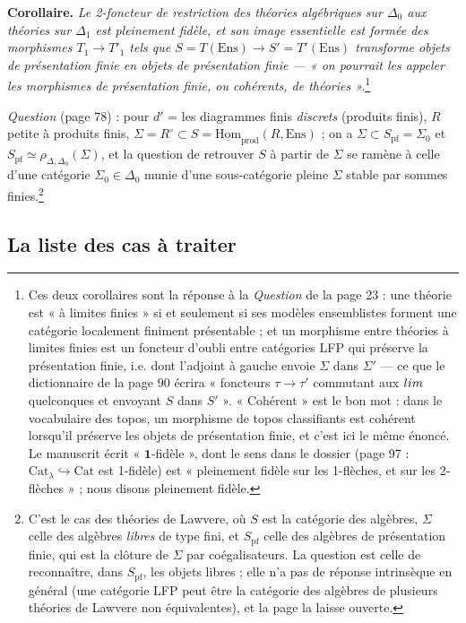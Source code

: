 \documentclass[11pt,a4paper]{article}
\begin{document}
\textbf{Corollaire.} \emph{Le 2-foncteur de restriction des théories
algébriques sur $\Delta_{0}$ aux théories sur $\Delta_{1}$ est pleinement
fidèle, et son image essentielle est formée des morphismes $T_{1} \to
T'_{1}$ tels que $S = T(\mathrm{Ens}) \to S' = T'(\mathrm{Ens})$ transforme
objets de présentation finie en objets de présentation finie — « on
pourrait les appeler les morphismes de présentation finie, ou cohérents,
de théories ».}\footnote{Ces deux corollaires sont la réponse à la
\emph{Question} de la page 23 : une théorie est « à limites finies » si et
seulement si ses modèles ensemblistes forment une catégorie localement
finiment présentable ; et un morphisme entre théories à limites finies est
un foncteur d'oubli entre catégories LFP qui préserve la présentation
finie, i.e. dont l'adjoint à gauche envoie $\Sigma$ dans $\Sigma'$ — ce
que le dictionnaire de la page 90 écrira « foncteurs $\tau \to \tau'$
commutant aux $\varinjlim$ quelconques et envoyant $S$ dans $S'$ ».
« Cohérent » est le bon mot : dans le vocabulaire des topos, un morphisme
de topos classifiants est cohérent lorsqu'il préserve les objets de
présentation finie, et c'est ici le même énoncé. Le manuscrit écrit
« $\mathbf{1}$-fidèle », dont le sens dans le dossier (page 97 : $\mathrm{Cat}
_{\lambda} \hookrightarrow \mathrm{Cat}$ est 1-fidèle) est « pleinement
fidèle sur les 1-flèches, et sur les 2-flèches » ; nous disons pleinement
fidèle.}

\emph{Question} (page 78) : pour $d'$ = les diagrammes finis
\emph{discrets} (produits finis), $R$ petite à produits finis, $\Sigma =
R^{\circ} \subset S = \underline{\mathrm{Hom}}_{\mathrm{prod}}(R, \mathrm{Ens})$ ;
on a $\Sigma \subset S_{\mathrm{pf}} = \Sigma_{0}$ et $S_{\mathrm{pf}} \simeq
\rho_{\Delta,\Delta_{0}}(\Sigma)$, et la question de retrouver $S$ à partir
de $\Sigma$ se ramène à celle d'une catégorie $\Sigma_{0} \in \Delta_{0}$
munie d'une sous-catégorie pleine $\Sigma$ stable par sommes
finies.\footnote{C'est le cas des théories de Lawvere, où $S$ est la
catégorie des algèbres, $\Sigma$ celle des algèbres \emph{libres} de type
fini, et $S_{\mathrm{pf}}$ celle des algèbres de présentation finie, qui
est la clôture de $\Sigma$ par coégalisateurs. La question est celle de
reconnaître, dans $S_{\mathrm{pf}}$, les objets libres ; elle n'a pas de
réponse intrinsèque en général (une catégorie LFP peut être la catégorie
des algèbres de plusieurs théories de Lawvere non équivalentes), et la
page la laisse ouverte.}

\subsection*{La liste des cas à traiter}
\end{document}
